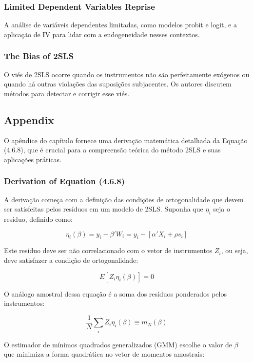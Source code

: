 \documentclass[a4paper,12pt]{article}[abntex2]
\begin{document}
\subsubsection{Limited Dependent Variables Reprise}
A análise de variáveis dependentes limitadas, como modelos probit e logit, e a aplicação de IV para lidar com a endogeneidade nesses contextos.

\subsubsection{The Bias of 2SLS}
O viés de 2SLS ocorre quando os instrumentos não são perfeitamente exógenos ou quando há outras violações das suposições subjacentes. Os autores discutem métodos para detectar e corrigir esse viés.

\subsection{Appendix}
O apêndice do capítulo fornece uma derivação matemática detalhada da Equação (4.6.8), que é crucial para a compreensão teórica do método 2SLS e suas aplicações práticas.

\subsubsection{Derivation of Equation (4.6.8)}
A derivação começa com a definição das condições de ortogonalidade que devem ser satisfeitas pelos resíduos em um modelo de 2SLS. Suponha que \( \eta_i \) seja o resíduo, definido como:

\begin{equation}
\eta_i(\beta) = y_i - \beta' W_i = y_i - [\alpha' X_i + \rho s_i]
\end{equation}

Este resíduo deve ser não correlacionado com o vetor de instrumentos \( Z_i \), ou seja, deve satisfazer a condição de ortogonalidade:

\begin{equation}
E[Z_i \eta_i(\beta)] = 0
\end{equation}

O análogo amostral dessa equação é a soma dos resíduos ponderados pelos instrumentos:

\begin{equation}
\frac{1}{N} \sum_i Z_i \eta_i(\beta) \equiv m_N(\beta)
\end{equation}

O estimador de mínimos quadrados generalizados (GMM) escolhe o valor de \( \beta \) que minimiza a forma quadrática no vetor de momentos amostrais:
\end{document}
